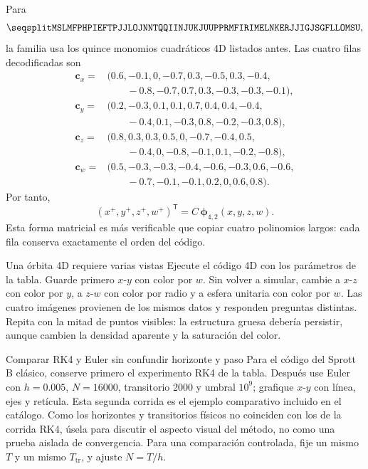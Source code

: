 Para
\[
\codigolargo{MSLMFPHPIEFTPJJLOJNNTQQIINJUKJUUPPRMFIRIMELNKERJJIGJSGFLLOMSU},
\]
la familia  usa los quince monomios cuadráticos 4D listados antes. Las
cuatro filas decodificadas son
\[
\begin{aligned}
\mathbf{c}_x={}&(0.6,-0.1,0,-0.7,0.3,-0.5,0.3,-0.4,\\
&\qquad -0.8,-0.7,0.7,0.3,-0.3,-0.3,-0.1),\\
\mathbf{c}_y={}&(0.2,-0.3,0.1,0.1,0.7,0.4,0.4,-0.4,\\
&\qquad -0.4,0.1,-0.3,0.8,-0.2,-0.3,0.8),\\
\mathbf{c}_z={}&(0.8,0.3,0.3,0.5,0,-0.7,-0.4,0.5,\\
&\qquad -0.4,0,-0.8,-0.1,0.1,-0.2,-0.8),\\
\mathbf{c}_w={}&(0.5,-0.3,-0.3,-0.4,-0.6,-0.3,0.6,-0.6,\\
&\qquad -0.7,-0.1,-0.1,0.2,0,0.6,0.8).
\end{aligned}
\]
Por tanto,
\[
 (x^+,y^+,z^+,w^+)^{\mathsf T}
 =C\,\boldsymbol{\phi}_{4,2}(x,y,z,w).
\]
Esta forma matricial es más verificable que copiar cuatro polinomios largos:
cada fila conserva exactamente el orden del código.

\begin{laboratorio}{Una órbita 4D requiere varias vistas}
Ejecute el código 4D con los parámetros de la tabla. Guarde primero \(x\)-\(y\)
con color por \(w\). Sin volver a simular, cambie a \(x\)-\(z\) con color por
\(y\), a \(z\)-\(w\) con color por radio y a esfera unitaria con color por \(w\).
Las cuatro imágenes provienen de los mismos datos y responden preguntas distintas.
Repita con la mitad de puntos visibles: la estructura gruesa debería persistir,
aunque cambien la densidad aparente y la saturación del color.
\end{laboratorio}

\begin{laboratorio}{Comparar RK4 y Euler sin confundir horizonte y paso}
Para el código del Sprott B clásico, conserve primero el experimento RK4 de la
tabla. Después use Euler con \(h=0.005\), \(N=16000\), transitorio 2000 y umbral
\(10^9\); grafique \(x\)-\(y\) con línea, ejes y retícula. Esta segunda corrida
es el ejemplo comparativo incluido en el catálogo. Como los horizontes y
transitorios físicos no coinciden con los de la corrida RK4, úsela para discutir
el aspecto visual del método, no como una prueba aislada de convergencia. Para una
comparación controlada, fije un mismo \(T\) y un mismo
\(T_{\mathrm{tr}}\), y ajuste \(N=T/h\).
\end{laboratorio}

